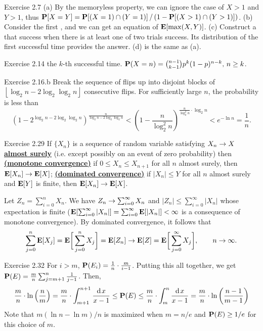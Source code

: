 \documentclass[main.tex]{subfiles}
\begin{document}
\bigskip

{\bs Exercise 2.7} (a) By the memoryless property, we can ignore the case of $X > 1$ and $Y >1$, thus $\mathbf{P}[X=Y]=\mathbf{P}[(X=1)\cap(Y=1)]\,/\,(1-\mathbf{P}[(X>1)\cap(Y>1)])$. (b) Consider the first , and we can get an equation of $\mathbf{E}[\max(X,Y)]$. (c) Construct a  that success when there is at least one of two trials success. Its distribution of the first successful time provides the answer. (d) is the same as (a).

{\bs Exercise 2.14}  the $k$-th successful time. $\mathbf{P}(X=n)=\binom{n-1}{k-1}p^k(1-p)^{n-k},\,n\ge k$.

{\bs Exercise 2.16.b} Break the sequence of flips up into disjoint blocks of $\left\lfloor \log_2 n - 2\log_2\log_2 n\right\rfloor$ consecutive flips. For sufficiently large $n$, the probability is less than
\[
	\left(1-2^{\log_2n-2\log_2\log_2n}\right)^\frac{n}{\log_2n-2\log_2\log_2n}<\left(1-\frac{n}{\log_2^2n}\right)^{\frac{n}{\log_2^2 n}\cdot\log_2 n} < e^{-\ln n} = \frac{1}{n}.
\]

{\bs Exercise 2.29} If $\{X_n\}$ is a sequence of random variable satisfying $X_n\rightarrow X$ \href{https://en.wikipedia.org/wiki/Almost_surely}{\bf almost surely} (i.e. except possibly on an event of zero probability) then \href{https://en.wikipedia.org/wiki/Monotone_convergence_theorem}{\bf (monotone convergence)} if $0\le X_n\le X_{n+1}$ for all $n$ almost surely, then $\mathbf{E}[X_n]\rightarrow\mathbf{E}[X]$; \href{https://en.wikipedia.org/wiki/Dominated_convergence_theorem}{\bf (dominated convergence)} if $\lvert X_n\rvert \le Y$ for all $n$ almost surely and $\mathbf{E}[Y]$ is finite, then $\mathbf{E}[X_n]\rightarrow\mathbf{E}[X]$. 

Let $Z_n=\sum_{i=0}^{n}X_n$. We have $Z_n \rightarrow \sum_{i=0}^{\infty} X_n$ and $\lvert Z_n \rvert \le \sum_{i=0}^{\infty} \lvert X_n \rvert$ whose expectation is finite ($\mathbf{E}[\sum_{i=0}^{\infty}|X_n|]=\sum_{i=0}^{\infty}\mathbf{E}[|X_n|]<\infty$ is a consequence of monotone convergence). By dominated convergence, it follows that
\[
	\sum_{j=0}^{n}\mathbf{E}[X_j]=\mathbf{E}\biggl[\,\sum_{j=0}^{n}X_j\biggr]=\mathbf{E}[Z_n] \rightarrow \mathbf{E}[Z] = \mathbf{E}\biggl[\,\sum_{j=0}^{\infty}X_j\biggr],\qquad n \rightarrow \infty.
\]

{\bs Exercise 2.32} For $i > m$, $\mathbf{P}(E_i)=\frac{1}{n}\cdot\frac{m}{i-1}$. Putting this all together, we get $\mathbf{P}(E)=\frac{m}{n}\sum_{j=m+1}^{n} \frac{1}{j-1}$. Then,
\[
	\frac{m}{n}\cdot \ln\left(\frac{n}{m}\right)=\frac{m}{n}\cdot\int_{m+1}^{n+1}\frac{\mathrm{d}\;\! x}{x-1}\le \mathbf{P}(E)\le \frac{m}{n}\cdot\int_{m}^{n}\frac{\mathrm{d}\;\! x}{x-1}=\frac{m}{n}\cdot\ln\left(\frac{n-1}{m-1}\right)
\]
Note that $m(\ln n-\ln m)/n$ is maximized when $m=n/e$ and $\mathbf{P}(E) \ge 1/e$ for this choice of $m$.
\end{document}
